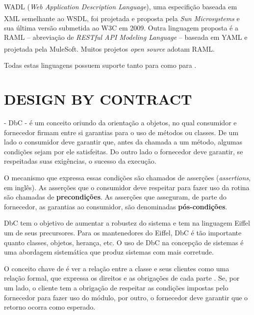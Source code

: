 WADL (\textit{Web Application Description Language}), uma especifição baseada em
XML semelhante ao WSDL, foi projetada e proposta pela \textit{Sun
Microsystems}\textsuperscript{\textregistered} e sua última versão submetida
ao W3C em 2009. Outra linguagem proposta é a RAML\cite{RAML} -- abreviação de
\textit{RESTful API Modeling Language} -- baseada em YAML e projetada pela
MuleSoft\textsuperscript{\textregistered}. Muitos projetos \textit{open source} adotam RAML.

Todas estas linguagens possuem suporte tanto para \CdFirst{} como para
\CtFirst{} \cite{wideberg2015restful}.




\section{DESIGN BY CONTRACT}
\label{Design-by-Contract}
\vspace{-6mm}

\designbycontract{} \cite{meyer1992applying} - DbC - é um conceito
oriundo da orientação a objetos, no qual consumidor e fornecedor firmam entre si garantias para
o uso de métodos ou classes. De um lado o consumidor deve garantir que, antes da
chamada a um método, algumas condições sejam por ele satisfeitas.
Do outro lado o fornecedor deve garantir, se respeitadas suas exigências,
o sucesso da execução.

O mecanismo que expressa essas condições são chamados de asserções
(\textit{assertions}, em inglês). As asserções que o consumidor deve respeitar
para fazer uso da rotina são chamadas de \textbf{precondições}. As asserções que
asseguram, de parte do fornecedor, as garantias ao consumidor, são denominadas
\textbf{pós-condições}.

DbC tem o objetivo de aumentar a robustez do sistema e tem na linguagem Eiffel
\cite{meyer1988eiffel} um de seus precursores. Para os mantenedores do Eiffel, DbC é
tão importante quanto classes, objetos, herança, etc. O uso de DbC na
concepção de sistemas é uma abordagem sistemática que produz sistemas com mais
corretude.

O conceito chave de \designbycontract{} é ver a relação entre a classe e
seus clientes como uma relação formal, que expressa os direitos e as
obrigações de cada parte \cite{meyer1997object}. Se, por um lado, o
cliente tem a obrigação de respeitar as condições impostas pelo fornecedor para fazer uso do módulo, por
outro, o fornecedor deve garantir que o retorno ocorra como esperado.

